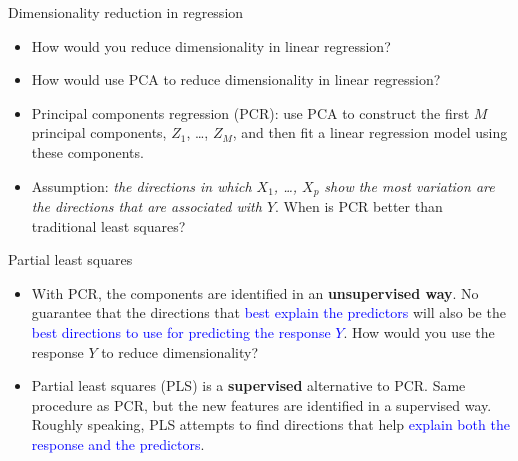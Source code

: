 \documentclass[14pt]{beamer}
\begin{document}
\begin{frame}{\normalsize Dimensionality reduction in regression}


\begin{itemize}
	\item How would you reduce dimensionality in linear regression?
	\item How would use PCA to reduce dimensionality in linear regression?
	\item Principal components regression (PCR): use PCA to construct the first $M$ principal components, $Z_1$, \dots, $Z_M$, and then fit a linear regression model using these components.
	\item Assumption: \emph{the directions in which $X_1$, \dots, $X_p$ show the most variation are the directions that are associated with $Y$}. When is PCR better than traditional least squares?
\end{itemize}

\end{frame}

\begin{frame}{Partial least squares}

\begin{itemize}
\item With PCR, the components are identified in an \textbf{unsupervised way}. No guarantee that the directions that \textcolor{blue}{best explain the predictors} will also be the \textcolor{blue}{best directions to use for predicting the response $Y$}. How would you use the response $Y$ to reduce dimensionality?
\pause
\item Partial least squares (PLS) is a \textbf{supervised} alternative to PCR. Same procedure as PCR, but the new features are identified in a supervised way. Roughly speaking, PLS attempts to find directions that help \textcolor{blue}{explain both the response and the predictors}.

\end{itemize}

\end{frame}
\end{document}
